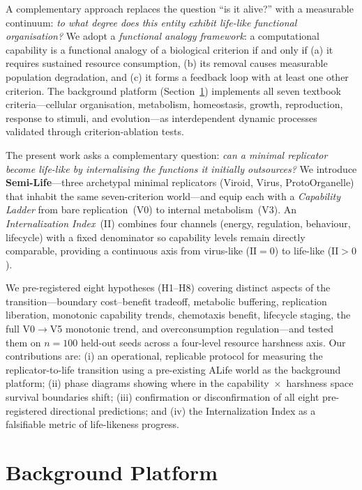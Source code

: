 \documentclass[letterpaper]{article}
\begin{document}
A complementary approach replaces the question ``is it alive?'' with a
measurable continuum: \emph{to what degree does this entity exhibit
life-like functional organisation?}
We adopt a \emph{functional analogy framework}: a computational capability is
a functional analogy of a biological criterion if and only if (a) it requires
sustained resource consumption, (b) its removal causes measurable population
degradation, and (c) it forms a feedback loop with at least one other criterion.
The background platform (Section~\ref{sec:background}) implements all seven
textbook criteria---cellular organisation, metabolism, homeostasis, growth,
reproduction, response to stimuli, and evolution---as interdependent dynamic
processes validated through criterion-ablation tests.

The present work asks a complementary question: \emph{can a minimal replicator
become life-like by internalising the functions it initially outsources?}
We introduce \textbf{Semi-Life}---three archetypal minimal replicators (Viroid,
Virus, ProtoOrganelle) that inhabit the same seven-criterion world---and equip
each with a \emph{Capability Ladder} from bare replication~(V0) to internal
metabolism~(V3).
An \emph{Internalization Index}~(II) combines four channels (energy,
regulation, behaviour, lifecycle) with a fixed denominator so capability
levels remain directly comparable, providing a continuous axis from
virus-like ($\mathrm{II}=0$) to life-like ($\mathrm{II}>0$).

We pre-registered eight hypotheses (H1--H8) covering distinct aspects of the
transition---boundary cost--benefit tradeoff, metabolic buffering, replication
liberation, monotonic capability trends, chemotaxis benefit, lifecycle staging,
the full V0$\to$V5 monotonic trend, and overconsumption regulation---and tested
them on $n=100$ held-out seeds across a four-level resource harshness axis.
Our contributions are: (i) an operational, replicable protocol for measuring the
replicator-to-life transition using a pre-existing ALife world as the background
platform; (ii) phase diagrams showing where in the capability~$\times$~harshness
space survival boundaries shift; (iii) confirmation or disconfirmation of all eight
pre-registered directional predictions; and (iv) the Internalization Index as a
falsifiable metric of life-likeness progress.

\section{Background Platform}
\label{sec:background}
\end{document}
